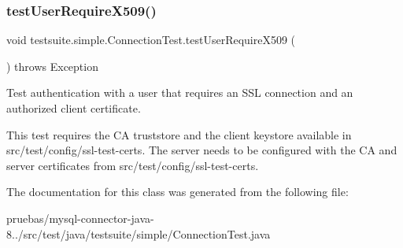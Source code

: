 \subsubsection{\texorpdfstring{test\+User\+Require\+X509()}{testUserRequireX509()}}
{\footnotesize\ttfamily void testsuite.\+simple.\+Connection\+Test.\+test\+User\+Require\+X509 (\begin{DoxyParamCaption}{ }\end{DoxyParamCaption}) throws Exception}

Test authentication with a user that requires an S\+SL connection and an authorized client certificate.

This test requires the CA truststore and the client keystore available in src/test/config/ssl-\/test-\/certs. The server needs to be configured with the CA and server certificates from src/test/config/ssl-\/test-\/certs. 

The documentation for this class was generated from the following file\+:\begin{DoxyCompactItemize}
\item 
pruebas/mysql-\/connector-\/java-\/8../src/test/java/testsuite/simple/Connection\+Test.\+java\end{DoxyCompactItemize}
